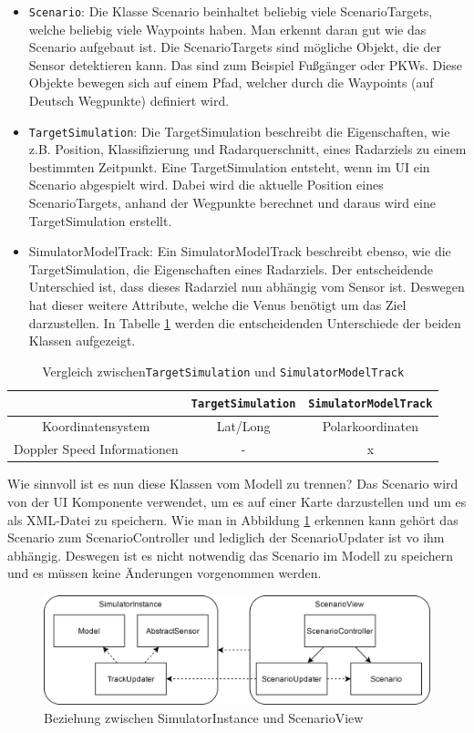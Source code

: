 \begin{itemize}
    \item \texttt{Scenario}: Die Klasse Scenario beinhaltet beliebig viele ScenarioTargets, welche beliebig viele Waypoints haben. Man erkennt daran gut wie das Scenario aufgebaut ist. Die ScenarioTargets sind mögliche Objekt, die der Sensor detektieren kann. Das sind zum Beispiel Fußgänger oder PKWs. Diese Objekte bewegen sich auf einem Pfad, welcher durch die Waypoints (auf Deutsch Wegpunkte) definiert wird.
    \item \texttt{TargetSimulation}:  Die TargetSimulation beschreibt die Eigenschaften, wie z.B. Position, Klassifizierung und Radarquerschnitt, eines Radarziels zu einem bestimmten Zeitpunkt. Eine TargetSimulation entsteht, wenn im UI ein Scenario abgespielt wird. Dabei wird die aktuelle Position eines ScenarioTargets, anhand der Wegpunkte berechnet und daraus wird eine TargetSimulation erstellt.
    \item SimulatorModelTrack: Ein SimulatorModelTrack beschreibt ebenso, wie die TargetSimulation, die Eigenschaften eines Radarziels. Der entscheidende Unterschied ist, dass dieses Radarziel nun abhängig vom Sensor ist. Deswegen hat dieser weitere Attribute, welche die Venus benötigt um das Ziel darzustellen. In Tabelle \ref{table:1} werden die entscheidenden Unterschiede der beiden Klassen aufgezeigt.    
\end{itemize}

\begin{table}[h]
    \begin{tabular}{ |c|c|c| } 
        \hline
         & \texttt{TargetSimulation} & \texttt{SimulatorModelTrack} \\ 
        \hline
        Koordinatensystem & Lat/Long & Polarkoordinaten \\ 
        \hline
        Doppler Speed Informationen & - & x \\ 
        \hline
        
   \end{tabular}
   \caption{Vergleich zwischen\texttt{TargetSimulation} und \texttt{SimulatorModelTrack}}
   \label{table:1}
\end{table}

Wie sinnvoll ist es nun diese Klassen vom Modell zu trennen? Das Scenario wird von der UI Komponente verwendet, um es auf einer Karte darzustellen und um es als XML-Datei zu speichern. Wie man in Abbildung \ref{figure:scenarioview} erkennen kann gehört das Scenario zum ScenarioController und lediglich der ScenarioUpdater ist vo ihm abhängig. Deswegen ist es nicht notwendig das Scenario im Modell zu speichern und es müssen keine Änderungen vorgenommen werden.

\begin{figure}[h!]
    \centering
    \includegraphics[width=1\textwidth]{content/assets/Kapitel3/ScenarioViewRelations.png}
    \caption{Beziehung zwischen SimulatorInstance und ScenarioView}
    \label{figure:scenarioview}
\end{figure}

